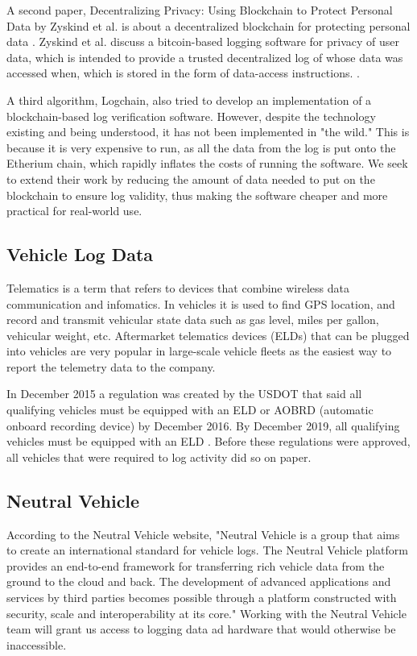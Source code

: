         A second paper, Decentralizing Privacy: Using Blockchain to Protect Personal Data by Zyskind et al. is about a decentralized blockchain for protecting personal data \cite{PrivacyChain}. Zyskind et al. discuss a bitcoin-based logging software for privacy of user data, which is intended to provide a trusted decentralized log of whose data was accessed when, which is stored in the form of data-access instructions. \cite{PrivacyChain}. 
        
         A third algorithm, Logchain, also tried to develop an implementation of a blockchain-based log verification software. However, despite the technology existing and being understood, it has not been implemented in "the wild." This is because it is very expensive to run, as all the data from the log is put onto the Etherium chain, which rapidly inflates the costs of running the software. \cite{Logchain} We seek to extend their work by reducing the amount of data needed to put on the blockchain to ensure log validity, thus making the software cheaper and more practical for real-world use. 
         
        \subsection{Vehicle Log Data}
        Telematics is a term that refers to devices that combine wireless data communication and infomatics. In vehicles it is used to find GPS location, and record and transmit vehicular state data such as gas level, miles per gallon, vehicular weight, etc. Aftermarket telematics devices (ELDs) that can be plugged into vehicles are very popular in large-scale vehicle fleets as the easiest way to report the telemetry data to the company. 

        In December 2015 a regulation was created by the USDOT that said all qualifying vehicles must be equipped with an ELD or AOBRD (automatic onboard recording device) by December 2016. By December 2019, all qualifying vehicles must be equipped with an ELD \cite{ELDRULE}. Before these regulations were approved, all vehicles that were required to log activity did so on paper.
        
        \subsection{Neutral Vehicle}
        According to the Neutral Vehicle website, "Neutral Vehicle is a group that aims to create an international standard for vehicle logs. The Neutral Vehicle platform provides an end-to-end framework for transferring rich vehicle data from the ground to the cloud and back. The development of advanced applications and services by third parties becomes possible through a platform constructed with security, scale and interoperability at its core\cite{NeutralVehicle}." Working with the Neutral Vehicle team will grant us access to logging data ad hardware that would otherwise be inaccessible.

